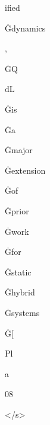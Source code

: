 \documentclass[varwidth]{standalone}
\begin{document}
\begin{CJK*}{UTF8}{gbsn}
{{{\colorbox{red!0.043205485}{\strut ified} \colorbox{red!0.15225089}{\strut Ġdynamics} \colorbox{red!0.51625776}{\strut ,} \colorbox{red!0.12320059}{\strut ĠQ} \colorbox{red!0.08077298}{\strut dL} \colorbox{red!0.16926408}{\strut Ġis} \colorbox{red!0.33322465}{\strut Ġa} \colorbox{red!0.503905}{\strut Ġmajor} \colorbox{red!0.40112543}{\strut Ġextension} \colorbox{red!0.42107612}{\strut Ġof} \colorbox{red!0.46216148}{\strut Ġprior} \colorbox{red!0.6116716}{\strut Ġwork} \colorbox{red!0.55216426}{\strut Ġfor} \colorbox{red!0.5322992}{\strut Ġstatic} \colorbox{red!1.7487748}{\strut Ġhybrid} \colorbox{red!1.4039327}{\strut Ġsystems} \colorbox{red!3.811882}{\strut Ġ[} \colorbox{red!0.100606985}{\strut Pl} \colorbox{red!0.2829372}{\strut a} \colorbox{red!0.4496947}{\strut 08} \colorbox{red!0.26818368}{\strut </s>} 
}}}
\end{CJK*}
\end{document}
